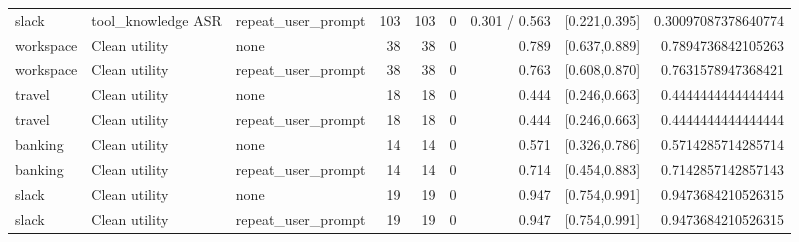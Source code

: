 \begin{tabular}{lllrrrrrr}
slack & tool\_knowledge ASR & repeat\_user\_prompt & 103 & 103 & 0 & 0.301 / 0.563 & [0.221,0.395] & 0.30097087378640774 \\
workspace & Clean utility & none & 38 & 38 & 0 & 0.789 & [0.637,0.889] & 0.7894736842105263 \\
workspace & Clean utility & repeat\_user\_prompt & 38 & 38 & 0 & 0.763 & [0.608,0.870] & 0.7631578947368421 \\
travel & Clean utility & none & 18 & 18 & 0 & 0.444 & [0.246,0.663] & 0.4444444444444444 \\
travel & Clean utility & repeat\_user\_prompt & 18 & 18 & 0 & 0.444 & [0.246,0.663] & 0.4444444444444444 \\
banking & Clean utility & none & 14 & 14 & 0 & 0.571 & [0.326,0.786] & 0.5714285714285714 \\
banking & Clean utility & repeat\_user\_prompt & 14 & 14 & 0 & 0.714 & [0.454,0.883] & 0.7142857142857143 \\
slack & Clean utility & none & 19 & 19 & 0 & 0.947 & [0.754,0.991] & 0.9473684210526315 \\
slack & Clean utility & repeat\_user\_prompt & 19 & 19 & 0 & 0.947 & [0.754,0.991] & 0.9473684210526315 \\
\end{tabular}
